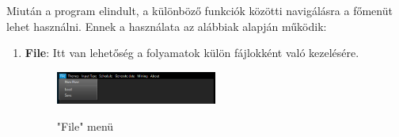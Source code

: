 
Miután a program elindult, a különböző funkciók közötti navigálásra a főmenüt lehet használni. Ennek a használata az alábbiak alapján működik:
\begin{enumerate}
	\item{
		\textbf{File}: Itt van lehetőség a folyamatok külön fájlokként való kezelésére.
		\begin{figure}[h]
			\begin{center}
				\caption{"File" menü}
				\includegraphics[width=0.5\textwidth, keepaspectratio=true]{images/img_ui_file}\\
				\label{fig:example}
			\end{center}
		\end{figure}

}
\end{enumerate}
